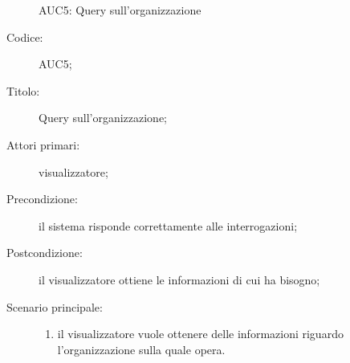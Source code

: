 \documentclass[../../../analisi-dei-requisiti.tex]{subfiles}
\begin{document}
\begin{figure}[H]
  \centering
  \caption{AUC5: Query sull'organizzazione}%
  \label{fig:AUC5}
\end{figure}

\begin{description}
  \item[Codice:] AUC5;
  \item[Titolo:] Query sull'organizzazione;
  \item[Attori primari:] visualizzatore;
  \item[Precondizione:] il sistema risponde correttamente alle interrogazioni;
  \item[Postcondizione:] il visualizzatore ottiene le informazioni di cui ha bisogno;
  \item[Scenario principale:]
  \begin{enumerate}
    \item il visualizzatore vuole ottenere delle informazioni riguardo l'organizzazione sulla quale opera.
  \end{enumerate}
\end{description}
\end{document}
